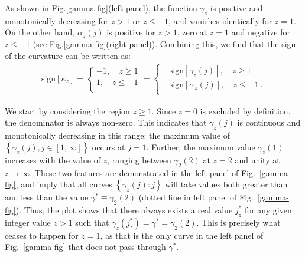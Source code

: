 As shown in Fig.\ref{gamma-fig}(left panel), the function \(\gamma_z\) is positive and monotonically decreasing for \(z > 1\) or \(z \leq -1\), and vanishes identically for \(z=1\). On the other hand, \(\alpha_z(j)\) is positive for \(z>1\), zero at \(z=1\) and negative for \(z \leq -1\) (see Fig.\ref{gamma-fig}(right panel)). Combining this, we find that the sign of the curvature can be written as:
\begin{equation}\begin{aligned}
	\text{sign}\left[\kappa_z\right] = \begin{cases}
		-1 , \quad  z \geq 1\\
		1 , \quad  z \leq -1\\
	\end{cases} = \begin{cases}
		-\text{sign}\left[\gamma_z(j)\right] , \quad  z \geq 1\\
		-\text{sign}\left[\alpha_z(j)\right] , \quad  z \leq -1~.\\
	\end{cases}
\end{aligned}\end{equation}

We start by considering the region \(z \geq 1\). Since \(z=0\) is excluded by definition, the denominator is always non-zero. This indicates that \(\gamma_z(j)\) is continuous and monotonically decreasing in this range: the maximum value of \(\left\{\gamma_z(j), j\in \left[1, \infty\right]\right\} \) occurs at \(j=1\). Further, the maximum value \(\gamma_z(1)\) increases with the value of \(z\), ranging between \(\gamma_2(2)\) at \(z=2\) and unity at \(z\to\infty\). These two features are demonstrated in the left panel of Fig.~\ref{gamma-fig}, and imply that all curves \(\left\{ \gamma_z(j):j \right\} \) will take values both greater than and less than the value \(\gamma^* \equiv \gamma_2(2)\) (dotted line in left panel of Fig.~\ref{gamma-fig}).
Thus, the plot shows that there always exists a real value \(j_z^*\) for any given integer value \(z>1\) such that \(\gamma_z(j_z^*) = \gamma^* = \gamma_2(2)\). This is precisely what ceases to happen for \(z=1\), as that is the only curve in the left panel of Fig.~\ref{gamma-fig} that does not pass through \(\gamma^*\).

